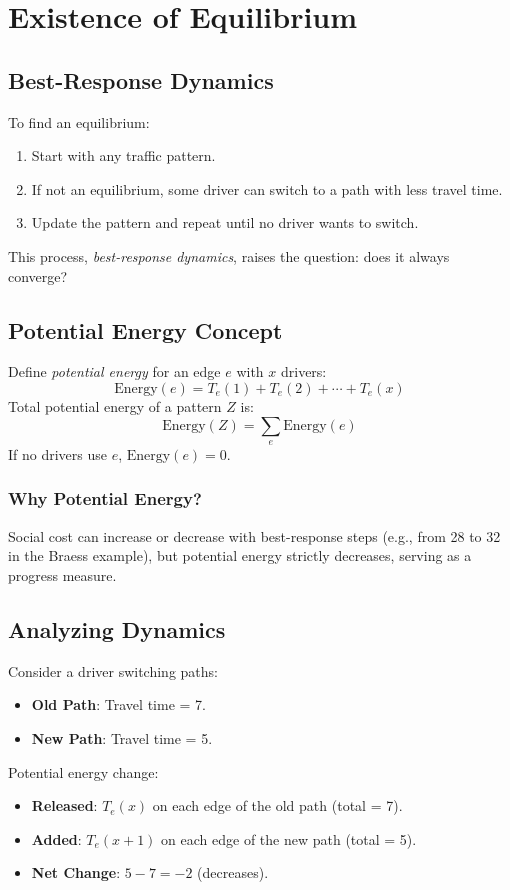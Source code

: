 \documentclass[a4paper,12pt]{article}
\begin{document}
\section{Existence of Equilibrium}
\subsection{Best-Response Dynamics}
To find an equilibrium:
\begin{enumerate}
    \item Start with any traffic pattern.
    \item If not an equilibrium, some driver can switch to a path with less travel time.
    \item Update the pattern and repeat until no driver wants to switch.
\end{enumerate}
This process, \emph{best-response dynamics}, raises the question: does it always converge?

\subsection{Potential Energy Concept}
Define \emph{potential energy} for an edge \( e \) with \( x \) drivers:
\[
\text{Energy}(e) = T_e(1) + T_e(2) + \cdots + T_e(x)
\]
Total potential energy of a pattern \( Z \) is:
\[
\text{Energy}(Z) = \sum_{e} \text{Energy}(e)
\]
If no drivers use \( e \), \( \text{Energy}(e) = 0 \).

\subsubsection{Why Potential Energy?}
Social cost can increase or decrease with best-response steps (e.g., from 28 to 32 in the Braess example), but potential energy strictly decreases, serving as a progress measure.

\subsection{Analyzing Dynamics}
Consider a driver switching paths:
\begin{itemize}
    \item \textbf{Old Path}: Travel time = 7.
    \item \textbf{New Path}: Travel time = 5.
\end{itemize}
Potential energy change:
\begin{itemize}
    \item \textbf{Released}: \( T_e(x) \) on each edge of the old path (total = 7).
    \item \textbf{Added}: \( T_e(x+1) \) on each edge of the new path (total = 5).
    \item \textbf{Net Change}: \( 5 - 7 = -2 \) (decreases).
\end{itemize}
\end{document}
